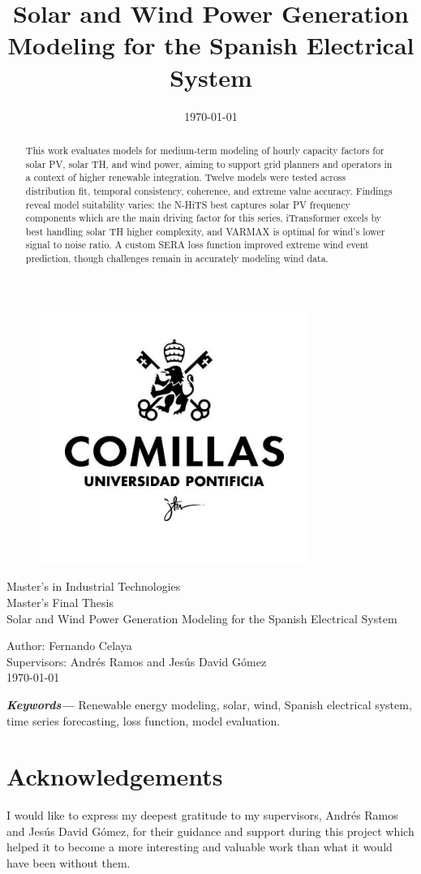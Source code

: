 \documentclass[12pt,a4paper,twoside]{article}
\title{Solar and Wind Power Generation Modeling for the Spanish Electrical System}
\date{\today}
\providecommand{\keywords}[1]
{
  \small	
  \textbf{\textit{Keywords---}} #1
}
\begin{document}
\pagestyle{empty}
\begin{titlepage}
  \begin{figure}
    \centering
    \includegraphics[width=0.3\linewidth]{assets/logo-comillas.png}
  \end{figure}
  \centering
  \Large 
  Master's in Industrial Technologies \\ Master's Final Thesis\\[36px]
  \Huge 
  Solar and Wind Power Generation Modeling for the Spanish Electrical System\\
  \Large
  \raggedright
  \vspace*{\fill}
  Author: Fernando Celaya\\
  Supervisors: Andrés Ramos and Jesús David Gómez\\
  \today

\end{titlepage}
\newpage

\begin{abstract}
  This work evaluates models for medium-term modeling of hourly capacity factors for solar PV, solar TH, and wind power, aiming to support grid planners and operators in a context of higher renewable integration. Twelve models were tested across distribution fit, temporal consistency, coherence, and extreme value accuracy. Findings reveal model suitability varies: the N-HiTS best captures solar PV frequency components which are the main driving factor for this series, iTransformer excels by best handling solar TH higher complexity, and VARMAX is optimal for wind's lower signal to noise ratio. A custom SERA loss function improved extreme wind event prediction, though challenges remain in accurately modeling wind data.
\end{abstract}
\keywords{Renewable energy modeling, solar, wind, Spanish electrical system, time series forecasting, loss function, model evaluation.}
\newpage

\section*{Acknowledgements}
I would like to express my deepest gratitude to my supervisors, Andrés Ramos and Jesús David Gómez, for their guidance and support during this project which helped it to become a more interesting and valuable work than what it would have been without them.
\newpage
\end{document}
